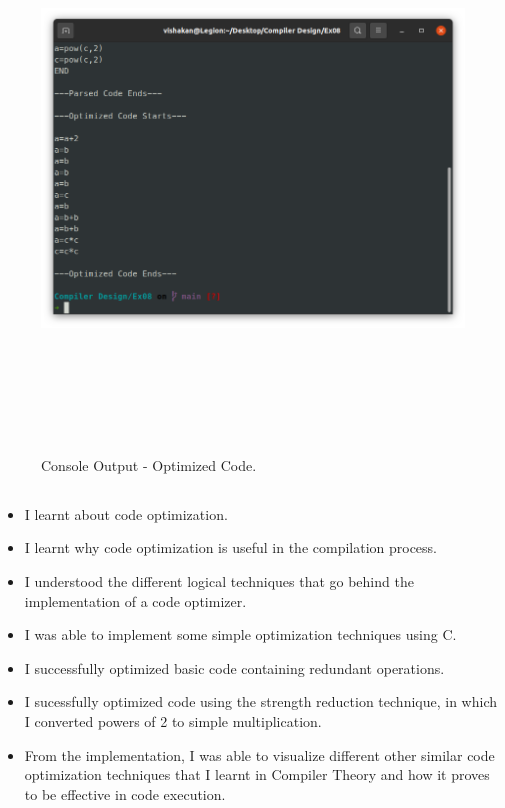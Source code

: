 \documentclass[12pt, a4]{article}
\begin{document}
\subsection*{}
\begin{figure}[h]
\centering
\caption{Console Output - Optimized Code.}
\includegraphics[height=15cm, width=15cm]{Output2.png}
\end{figure}

\newpage
\subsection*{}
\begin{itemize}
\item I learnt about code optimization.
\item I learnt why code optimization is useful in the compilation process.
\item I understood the different logical techniques that go behind the implementation of a code optimizer.
\item I was able to implement some simple optimization techniques using C.
\item I successfully optimized basic code containing redundant operations.
\item I sucessfully optimized code using the strength reduction technique, in which I converted powers of 2 to simple multiplication.
\item From the implementation, I was able to visualize different other similar code optimization techniques that I learnt in Compiler Theory and how it proves to be effective in code execution.

\end{itemize}
\end{document}
